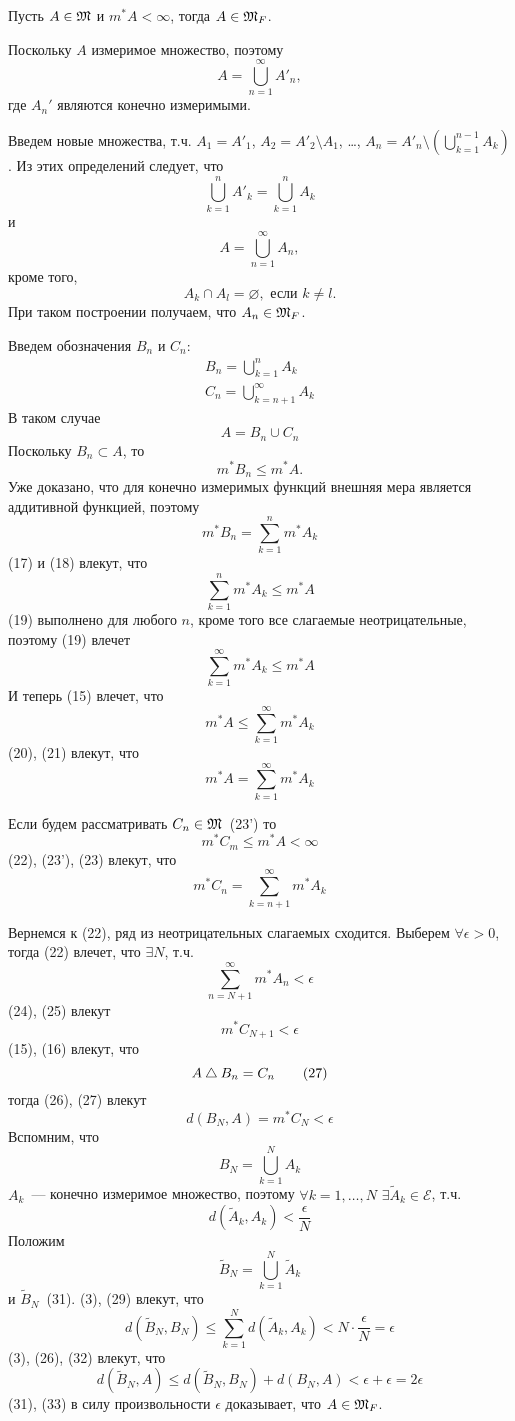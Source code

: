 \documentclass[main]{subfiles}
\begin{document}
\begin{theorem}
    Пусть $A \in \mathfrak{M}$ и $m^*A < \infty$, тогда $A \in \mathfrak{M}_F$.
\end{theorem}
\begin{longProof}
    Поскольку $A$ измеримое множество, поэтому
    \[A = \bigcup_{n=1}^\infty A'_n,\]
    где $A_n'$ являются конечно измеримыми.

    Введем новые множества, т.ч. $A_1 = A'_1$, $A_2 = A'_2 \setminus A_1$, \dots, $A_n = A'_n \setminus \left(\bigcup_{k=1}^{n-1} A_k\right)$.
    Из этих определений следует, что
    \[\bigcup_{k=1}^n A'_k = \bigcup_{k=1}^n A_k\]
    и
    \[A = \bigcup_{n=1}^\infty A_n, \tag{15}\]
    кроме того,
    \[A_k \cap A_l = \varnothing, \text{ если } k \neq l. \tag{16}\]
    При таком построении получаем, что $A_n \in \mathfrak{M}_F$.

    Введем обозначения $B_n$ и $C_n$:
    \begin{gather*}
        B_n = \bigcup_{k=1}^n A_k \\
        C_n = \bigcup_{k=n+1}^\infty A_k
    \end{gather*}
    В таком случае
    \[A = B_n \cup C_n\]
    Поскольку $B_n \subset A$, то
    \[m^* B_n \le m^* A. \tag{17}\]
    Уже доказано, что для конечно измеримых функций внешняя мера является аддитивной функцией, поэтому
    \[m^*B_n = \sum_{k=1}^{n} m^*A_k \tag{18}\]
    (17) и (18) влекут, что
    \[\sum_{k=1}^{n} m^* A_k \le m^* A \tag{19}\]
    (19) выполнено для любого $n$, кроме того все слагаемые неотрицательные, поэтому (19) влечет
    \[\sum_{k=1}^{\infty} m^*A_k \le m^* A \tag{20}\]
    И теперь (15) влечет, что
    \[m^* A \le \sum_{k=1}^{\infty} m^* A_k \tag{21}\]
    (20), (21) влекут, что
    \[m^* A = \sum_{k=1}^{\infty} m^* A_k \tag{22}\]

    Если будем рассматривать $C_n \in \mathfrak{M}$~(23') то
    \[m^* C_m \le m^* A < \infty\tag{23}\]
    (22), (23'), (23) влекут, что
    \[m^* C_n = \sum_{k=n+1}^{\infty} m^* A_k \tag{24}\]

    Вернемся к (22), ряд из неотрицательных слагаемых сходится.
    Выберем $\forall \epsilon >0$, тогда (22) влечет, что $\exists N$, т.ч.
    \[\sum_{n=N+1}^{\infty} m^*A_n < \epsilon \tag{25}\]
    (24), (25) влекут
    \[m^* C_{N+1} < \epsilon \tag{26}\]
    (15), (16) влекут, что
    \[A \mathbin{\triangle} B_n = C_n \tag{27}\]
    тогда (26), (27) влекут
    \[d(B_N, A) = m^* C_N < \epsilon \tag{28}\]
    Вспомним, что
    \[B_N = \bigcup_{k=1}^N A_k\]
    $A_k$~--- конечно измеримое множество, поэтому $\forall k = 1,\dotsc, N$ $\exists \widetilde{A}_k \in \mathcal{E}$, т.ч.
    \[d(\widetilde{A}_k, A_k) < \frac{\epsilon}{N} \tag{29}\]
    Положим
    \[\widetilde{B}_N = \bigcup_{k=1}^N \widetilde{A}_k \tag{30}\]
    и $\widetilde{B}_N$~(31).
    (3), (29) влекут, что
    \[d(\widetilde{B}_N, B_N) \le \sum_{k=1}^{N} d(\widetilde{A}_k, A_k) < N \cdot \frac{\epsilon}{N} = \epsilon \tag{32}\]
    (3), (26), (32) влекут, что
    \[d(\widetilde{B}_N, A) \le d(\widetilde{B}_N, B_N) + d(B_N, A) < \epsilon + \epsilon = 2\epsilon \tag{33}\]
    (31), (33) в силу произвольности $\epsilon$ доказывает, что $A \in \mathfrak{M}_F$.
\end{longProof}
\end{document}
